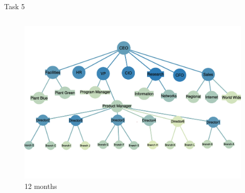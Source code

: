 \documentclass{beamer}
\begin{document}
\begin{CJK*}{UTF8}{gbsn}
\begin{frame}{Task 5}
\begin{columns}

\begin{figure}
\centering
\includegraphics[width=\textwidth]{fig/task-5-2.pdf}
\caption{12 months}
\end{figure}



\end{columns}

\end{frame}


\end{CJK*}
\end{document}
